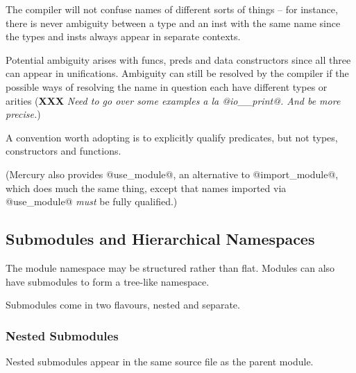 \documentclass[a4paper,11pt,notitlepage,onecolumn]{article}
\newcommand{\XXX}[1]%
{{\small\textbf{XXX} \emph{#1}}}
\begin{document}
The compiler will not confuse names of different sorts of
things -- for instance, there is never ambiguity between a type
and an inst with the same name since the types and insts
always appear in separate contexts.

Potential ambiguity arises with funcs, preds and data
constructors since all three can appear in unifications.
Ambiguity can still be resolved by the compiler if the
possible ways of resolving the name in question each have
different types or arities (\XXX{Need to go over some examples
a la @io\_\_print@.  And be more precise.})

A convention worth adopting is to explicitly qualify
predicates, but not types, constructors and functions.

(Mercury also provides @use_module@, an alternative to @import_module@,
which does much the same thing, except that names imported via
@use_module@ \emph{must} be fully qualified.)

\subsection{Submodules and Hierarchical Namespaces}

The module namespace may be structured rather than flat.  Modules can
also have submodules to form a tree-like namespace.

Submodules come in two flavours, nested and separate.

\subsubsection{Nested Submodules}

Nested submodules appear in the same source file as the parent module.
\end{document}
